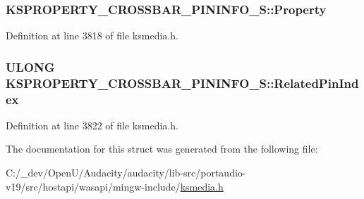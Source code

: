 \subsubsection[{\texorpdfstring{Property}{Property}}]{ K\+S\+P\+R\+O\+P\+E\+R\+T\+Y\+\_\+\+C\+R\+O\+S\+S\+B\+A\+R\+\_\+\+P\+I\+N\+I\+N\+F\+O\+\_\+\+S\+::\+Property}\hypertarget{struct_k_s_p_r_o_p_e_r_t_y___c_r_o_s_s_b_a_r___p_i_n_i_n_f_o___s_a534b8638717a198da8f3e680d0e07b6d}{}\label{struct_k_s_p_r_o_p_e_r_t_y___c_r_o_s_s_b_a_r___p_i_n_i_n_f_o___s_a534b8638717a198da8f3e680d0e07b6d}


Definition at line 3818 of file ksmedia.\+h.

\subsubsection[{\texorpdfstring{Related\+Pin\+Index}{RelatedPinIndex}}]{\setlength{\rightskip}{0pt plus 5cm}U\+L\+O\+NG K\+S\+P\+R\+O\+P\+E\+R\+T\+Y\+\_\+\+C\+R\+O\+S\+S\+B\+A\+R\+\_\+\+P\+I\+N\+I\+N\+F\+O\+\_\+\+S\+::\+Related\+Pin\+Index}\hypertarget{struct_k_s_p_r_o_p_e_r_t_y___c_r_o_s_s_b_a_r___p_i_n_i_n_f_o___s_a04fbeb9e5c078192398b9e9d6a61928e}{}\label{struct_k_s_p_r_o_p_e_r_t_y___c_r_o_s_s_b_a_r___p_i_n_i_n_f_o___s_a04fbeb9e5c078192398b9e9d6a61928e}


Definition at line 3822 of file ksmedia.\+h.



The documentation for this struct was generated from the following file\+:\begin{DoxyCompactItemize}
\item 
C\+:/\+\_\+dev/\+Open\+U/\+Audacity/audacity/lib-\/src/portaudio-\/v19/src/hostapi/wasapi/mingw-\/include/\hyperlink{ksmedia_8h}{ksmedia.\+h}\end{DoxyCompactItemize}
